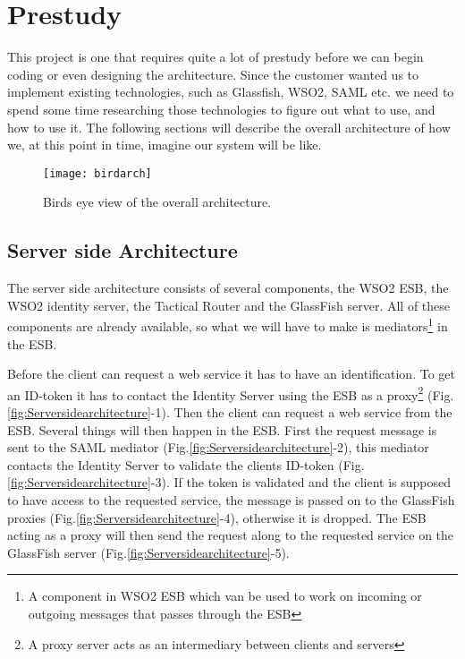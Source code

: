 \section{Prestudy}\label{Prestudy} This project is one that requires quite a lot of prestudy before we can begin coding or even designing the architecture. Since the customer wanted us to implement existing technologies, such as Glassfish, WSO2, SAML etc. we need to spend some time researching those technologies to figure out what to use, and how to use it. The following sections will describe the overall architecture of how we, at this point in time, imagine our system will be like. 

        \begin{figure}[htb]
            \centering
            \texttt{[image: birdarch]}
            \caption{Birds eye view of the overall architecture.}
            \label{fig:birdarch}
        \end{figure}

    \subsection{Server side Architecture}\label{Server side Architecture}
    
        The server side architecture consists of several components, the WSO2 ESB, the WSO2 \gls{identity server}, the Tactical Router and the GlassFish server. All of these components are already available, so what we will have to make is \glspl{mediator}\footnote{A component in WSO2 ESB which van be used to work on incoming or outgoing messages that passes through the ESB} in the ESB.

        Before the client can request a web service it has to have an identification. To get an ID-\gls{token} it has to contact the Identity Server using the ESB as a \gls{proxy}\footnote{A proxy server acts as an intermediary between clients and servers} (Fig.\ref{fig:Serversidearchitecture}-1). Then the client can request a web service from the ESB. Several things will then happen in the ESB. First the request message is sent to the SAML mediator (Fig.\ref{fig:Serversidearchitecture}-2), this mediator contacts the Identity Server to validate the clients ID-token (Fig.\ref{fig:Serversidearchitecture}-3). If the token is validated and the client is supposed to have access to the requested service, the message is passed on to the GlassFish proxies (Fig.\ref{fig:Serversidearchitecture}-4), otherwise it is dropped. The ESB acting as a proxy will then send the request along to the requested service on the GlassFish server (Fig.\ref{fig:Serversidearchitecture}-5).

